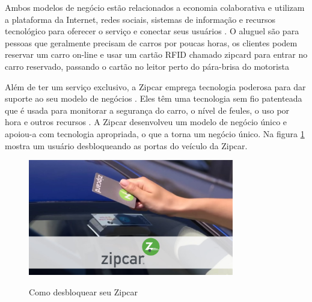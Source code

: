 Ambos modelos de negócio estão relacionados a economia colaborativa e utilizam a plataforma da Internet, redes sociais, sistemas de informação e recursos tecnológico para oferecer o serviço e conectar seus usuários \cite{ballus-armet}. O aluguel são para pessoas que geralmente precisam de carros por poucas horas, %
os clientes podem reservar um carro on-line e usar um cartão RFID chamado zipcard para entrar no carro reservado, passando o cartão no leitor perto do pára-brisa do motorista \cite{pearlson2009strategic} %

Além de ter um serviço exclusivo, a Zipcar emprega tecnologia poderosa para dar suporte ao seu modelo de negócios \cite{pearlson2009strategic}. Eles têm uma tecnologia sem fio patenteada que é usada para monitorar a segurança do carro, o nível de feules, o uso por hora e outros recursos \cite{pearlson2009strategic}. A Zipcar desenvolveu um modelo de negócio único e apoiou-a com tecnologia apropriada, o que a torna um negócio único. Na figura \ref{fig:zipcar} mostra um usuário desbloqueando as portas do veículo da Zipcar.

\begin{figure}[!hbtp]
	\centering
	\caption{Como desbloquear seu Zipcar}
	\includegraphics[width=0.8\textwidth]{./04-figuras/zipcar/zipcar.jpg}
	\label{fig:zipcar}
\end{figure}



